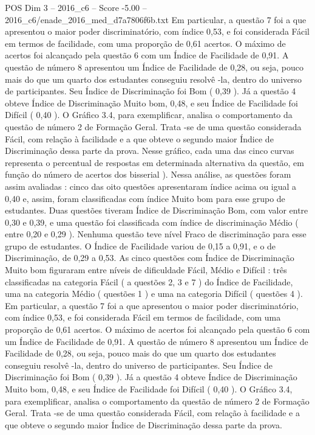 \begin{textsample}{POS Dim 3 – 2016\_c6 – Score -5.00 – 2016\_c6/enade\_2016\_med\_d7a7806f6b.txt}
Em particular, a questão 7 foi a que apresentou o maior poder discriminatório, com índice 0,53, e foi considerada Fácil em termos de facilidade, com uma proporção de 0,61 acertos.
O máximo de acertos foi alcançado pela questão 6 com um Índice de Facilidade de 0,91.
A questão de número 8 apresentou um Índice de Facilidade de 0,28, ou seja, pouco mais do que um quarto dos estudantes conseguiu resolvê -la, dentro do universo de participantes.
Seu Índice de Discriminação foi Bom ( 0,39 ).
Já a questão 4 obteve Índice de Discriminação Muito bom, 0,48, e seu Índice de Facilidade foi Difícil ( 0,40 ).
O Gráfico 3.4, para exemplificar, analisa o comportamento da questão de número 2 de Formação Geral.
Trata -se de uma questão considerada Fácil, com relação à facilidade e a que obteve o segundo maior Índice de Discriminação dessa parte da prova.
Nesse gráfico, cada uma das cinco curvas representa o percentual de respostas em determinada alternativa da questão, em função do número de acertos dos bisserial ).
Nessa análise, as questões foram assim avaliadas : cinco das oito questões apresentaram índice acima ou igual a 0,40 e, assim, foram classificadas com índice Muito bom para esse grupo de estudantes.
Duas questões tiveram Índice de Discriminação Bom, com valor entre 0,30 e 0,39, e uma questão foi classificada com índice de discriminação Médio ( entre 0,20 e 0,29 ).
Nenhuma questão teve nível Fraco de discriminação para esse grupo de estudantes.
O Índice de Facilidade variou de 0,15 a 0,91, e o de Discriminação, de 0,29 a 0,53.
As cinco questões com Índice de Discriminação Muito bom figuraram entre níveis de dificuldade Fácil, Médio e Difícil : três classificadas na categoria Fácil ( a questões 2, 3 e 7 ) do Índice de Facilidade, uma na categoria Médio ( questões 1 ) e uma na categoria Difícil ( questões 4 ).
Em particular, a questão 7 foi a que apresentou o maior poder discriminatório, com índice 0,53, e foi considerada Fácil em termos de facilidade, com uma proporção de 0,61 acertos.
O máximo de acertos foi alcançado pela questão 6 com um Índice de Facilidade de 0,91.
A questão de número 8 apresentou um Índice de Facilidade de 0,28, ou seja, pouco mais do que um quarto dos estudantes conseguiu resolvê -la, dentro do universo de participantes.
Seu Índice de Discriminação foi Bom ( 0,39 ).
Já a questão 4 obteve Índice de Discriminação Muito bom, 0,48, e seu Índice de Facilidade foi Difícil ( 0,40 ).
O Gráfico 3.4, para exemplificar, analisa o comportamento da questão de número 2 de Formação Geral.
Trata -se de uma questão considerada Fácil, com relação à facilidade e a que obteve o segundo maior Índice de Discriminação dessa parte da prova.

\end{textsample}
